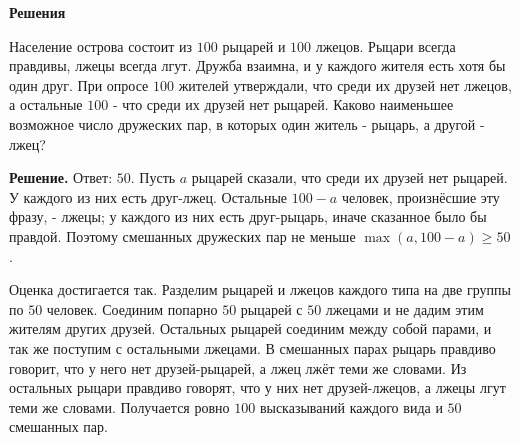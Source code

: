 

\ifPDFTeX
  \renewcommand{\rmdefault}{cmr}
\fi

\def\SheetNo{4}
\setlength{\emergencystretch}{2em}


\begin{center}\textbf{Решения}\end{center}

\begin{problems}

\item Население острова состоит из $100$ рыцарей и $100$ лжецов.
Рыцари всегда правдивы, лжецы всегда лгут. Дружба взаимна, и у каждого
жителя есть хотя бы один друг. При опросе $100$ жителей утверждали,
что среди их друзей нет лжецов, а остальные $100$ - что среди их
друзей нет рыцарей. Каково наименьшее возможное число дружеских пар,
в которых один житель - рыцарь, а другой - лжец?
\par\smallskip\noindent\textbf{Решение.} Ответ: $50$. Пусть $a$ рыцарей сказали, что среди их друзей нет рыцарей. У каждого из них есть друг-лжец. Остальные $100-a$ человек, произнёсшие эту фразу, - лжецы; у каждого из них есть друг-рыцарь, иначе сказанное было бы правдой. Поэтому смешанных дружеских пар не меньше $\max(a,100-a)\ge50$.
\par Оценка достигается так. Разделим рыцарей и лжецов каждого типа на две группы по $50$ человек. Соединим попарно $50$ рыцарей с $50$ лжецами и не дадим этим жителям других друзей. Остальных рыцарей соединим между собой парами, и так же поступим с остальными лжецами. В смешанных парах рыцарь правдиво говорит, что у него нет друзей-рыцарей, а лжец лжёт теми же словами. Из остальных рыцари правдиво говорят, что у них нет друзей-лжецов, а лжецы лгут теми же словами. Получается ровно $100$ высказываний каждого вида и $50$ смешанных пар.\par


\end{problems}
